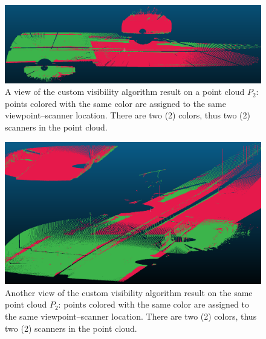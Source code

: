 \begin{figure}[h]
  \centering
  \includegraphics[scale=0.35]{img/custom-result3.png}
  \caption{A view of the custom visibility algorithm result on a point cloud $P_2$: points colored with the same color are assigned to the same viewpoint--scanner location. There are two (2) colors, thus two (2) scanners in the point cloud.}
  \label{fig:custom-result3}
\end{figure}
\begin{figure}[h]
  \centering
  \includegraphics[scale=0.35]{img/custom-result4.png}
  \caption{Another view of the custom visibility algorithm result on the same point cloud $P_2$: points colored with the same color are assigned to the same viewpoint--scanner location. There are two (2) colors, thus two (2) scanners in the point cloud.}
  \label{fig:custom-result4}
\end{figure}

